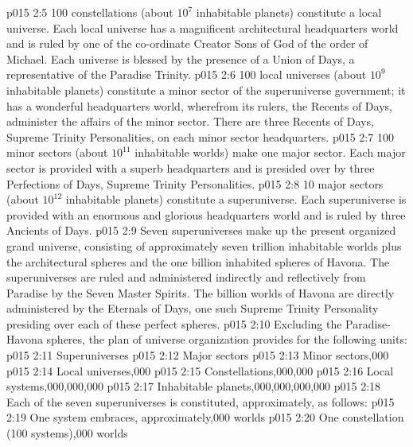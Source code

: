 \vs p015 2:5 \bibnobreakspace {} 100 constellations (about $10^7$ inhabitable planets) constitute a local universe. Each local universe has a magnificent architectural headquarters world and is ruled by one of the co\hyp{}ordinate Creator Sons of God of the order of Michael. Each universe is blessed by the presence of a Union of Days, a representative of the Paradise Trinity.
\vs p015 2:6 \bibnobreakspace {} 100 local universes (about $10^9$ inhabitable planets) constitute a minor sector of the superuniverse government; it has a wonderful headquarters world, wherefrom its rulers, the Recents of Days, administer the affairs of the minor sector. There are three Recents of Days, Supreme Trinity Personalities, on each minor sector headquarters.
\vs p015 2:7 \bibnobreakspace {} 100 minor sectors (about $10^{11}$ inhabitable worlds) make one major sector. Each major sector is provided with a superb headquarters and is presided over by three Perfections of Days, Supreme Trinity Personalities.
\vs p015 2:8 \bibnobreakspace {} 10 major sectors (about $10^{12}$ inhabitable planets) constitute a superuniverse. Each superuniverse is provided with an enormous and glorious headquarters world and is ruled by three Ancients of Days.
\vs p015 2:9 \bibnobreakspace {} Seven superuniverses make up the present organized grand universe, consisting of approximately seven trillion inhabitable worlds plus the architectural spheres and the one billion inhabited spheres of Havona. The superuniverses are ruled and administered indirectly and reflectively from Paradise by the Seven Master Spirits. The billion worlds of Havona are directly administered by the Eternals of Days, one such Supreme Trinity Personality presiding over each of these perfect spheres.
\vs p015 2:10 \pc Excluding the Paradise\hyp{}Havona spheres, the plan of universe organization provides for the following units:
\vs p015 2:11 Superuniverses
\vs p015 2:12 Major sectors
\vs p015 2:13 Minor sectors,000
\vs p015 2:14 Local universes,000
\vs p015 2:15 Constellations,000,000
\vs p015 2:16 Local systems,000,000,000
\vs p015 2:17 Inhabitable planets,000,000,000,000
\vs p015 2:18 Each of the seven superuniverses is constituted, approximately, as follows:
\vs p015 2:19 One system embraces, approximately,000 worlds
\vs p015 2:20 One constellation (100 systems),000 worlds

